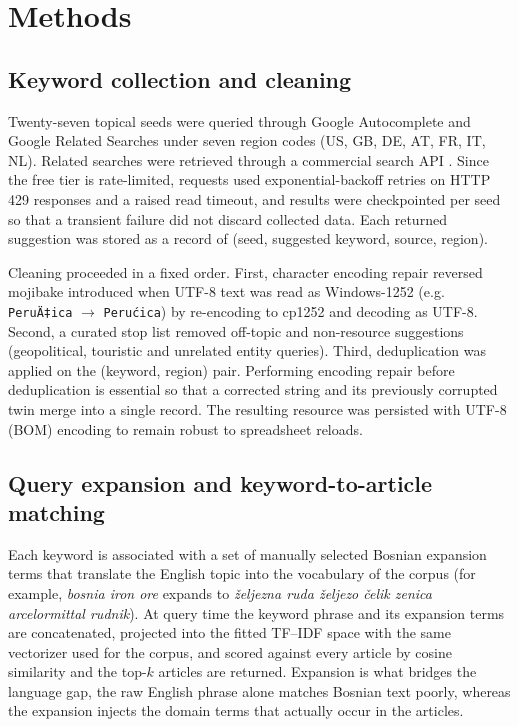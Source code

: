 \documentclass[fleqn,10pt]{wlscirep}
\begin{document}
\section*{Methods}

\subsection*{Keyword collection and cleaning}

Twenty-seven topical seeds were queried through Google Autocomplete and Google Related Searches under seven region codes (US, GB, DE, AT, FR, IT, NL). Related searches were retrieved through a commercial search API \cite{serpapi2024}. Since the free tier is rate-limited, requests used exponential-backoff retries on HTTP 429 responses and a raised read timeout, and results were checkpointed per seed so that a transient failure did not discard collected data. Each returned suggestion was stored as a record of (seed, suggested keyword, source, region).

Cleaning proceeded in a fixed order. First, character encoding repair reversed mojibake introduced when UTF-8 text was read as Windows-1252 (e.g. \texttt{PeruÄ‡ica} $\rightarrow$ \texttt{Perućica}) by re-encoding to cp1252 and decoding as UTF-8. Second, a curated stop list removed off-topic and non-resource suggestions (geopolitical, touristic and unrelated entity queries). Third, deduplication was applied on the (keyword, region) pair. Performing encoding repair before deduplication is essential so that a corrected string and its previously corrupted twin merge into a single record. The resulting resource was persisted with UTF-8 (BOM) encoding to remain robust to spreadsheet reloads.

\subsection*{Query expansion and keyword-to-article matching}

Each keyword is associated with a set of manually selected Bosnian expansion terms that translate the English topic into the vocabulary of the corpus (for example, \emph{bosnia iron ore} expands to \emph{željezna ruda željezo čelik zenica arcelormittal rudnik}). At query time the keyword phrase and its expansion terms are concatenated, projected into the fitted TF--IDF space with the same vectorizer used for the corpus, and scored against every article by cosine similarity and the top-$k$ articles are returned. Expansion is what bridges the language gap, the raw English phrase alone matches Bosnian text poorly, whereas the expansion injects the domain terms that actually occur in the articles.
\end{document}
